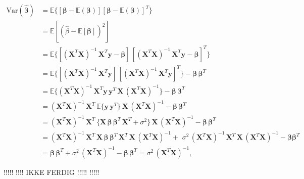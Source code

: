 \begin{align*}
\mbox{Var}(\boldsymbol{\hat{\beta}}) 
&= \mathbb{E} \{ [\boldsymbol{\beta} - \mathbb{E}(\boldsymbol{\beta})] [\boldsymbol{\beta} - \mathbb{E}(\boldsymbol{\beta})]^{T} \}
\\
&= \mathbb{E}[(\hat\beta - \mathbb{E}[\boldsymbol\beta])^2 ]
\\
&= \mathbb{E} \{ [(\mathbf{X}^{T} \mathbf{X})^{-1} \, \mathbf{X}^{T} \mathbf{y} - \boldsymbol{\beta}] \, [(\mathbf{X}^{T} \mathbf{X})^{-1} \, \mathbf{X}^{T} \mathbf{y} - \boldsymbol{\beta}]^{T} \}
\\
&=  \mathbb{E} \{ [(\mathbf{X}^{T} \mathbf{X})^{-1} \, \mathbf{X}^{T} \mathbf{y}] \, [(\mathbf{X}^{T} \mathbf{X})^{-1} \, \mathbf{X}^{T} \mathbf{y}]^{T} \} - \boldsymbol{\beta} \, \boldsymbol{\beta}^{T}
\\
&=  \mathbb{E} \{ (\mathbf{X}^{T} \mathbf{X})^{-1} \, \mathbf{X}^{T} \mathbf{y} \, \mathbf{y}^{T} \, \mathbf{X} \, (\mathbf{X}^{T} \mathbf{X})^{-1}  \} - \boldsymbol{\beta} \, \boldsymbol{\beta}^{T}
\\
&= (\mathbf{X}^{T} \mathbf{X})^{-1} \, \mathbf{X}^{T} \, \mathbb{E} \{ \mathbf{y} \, \mathbf{y}^{T} \} \, \mathbf{X} \, (\mathbf{X}^{T} \mathbf{X})^{-1} - \boldsymbol{\beta} \, \boldsymbol{\beta}^{T}
\\
&= (\mathbf{X}^{T} \mathbf{X})^{-1} \, \mathbf{X}^{T} \, \{ \mathbf{X} \, \boldsymbol{\beta} \, \boldsymbol{\beta}^{T} \,  \mathbf{X}^{T} + \sigma^2 \} \, \mathbf{X} \, (\mathbf{X}^{T} \mathbf{X})^{-1} - \boldsymbol{\beta} \, \boldsymbol{\beta}^{T}
\\
&= (\mathbf{X}^T \mathbf{X})^{-1} \, \mathbf{X}^T \, \mathbf{X} \, \boldsymbol{\beta} \, \boldsymbol{\beta}^T \,  \mathbf{X}^T \, \mathbf{X} \, (\mathbf{X}^T  \mathbf{X})^{-1} +  \, \, \sigma^2 \, (\mathbf{X}^T \mathbf{X})^{-1} \, \mathbf{X}^T  \, \mathbf{X} \, (\mathbf{X}^T \mathbf{X})^{-1} - \boldsymbol{\beta} \boldsymbol{\beta}^T
\\
&= \boldsymbol{\beta} \, \boldsymbol{\beta}^{T}  + \sigma^2 \, (\mathbf{X}^{T} \mathbf{X})^{-1} - \boldsymbol{\beta} \, \boldsymbol{\beta}^{T}
 =  \sigma^2 \, (\mathbf{X}^{T} \mathbf{X})^{-1},
\end{align*}







!!!!! !!!! IKKE FERDIG !!!!! !!!!!
